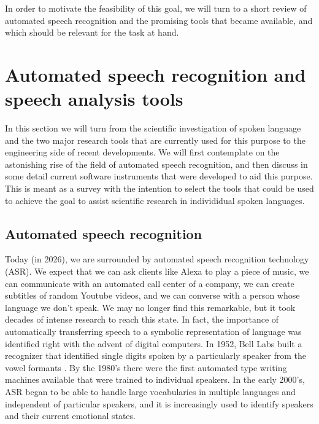 In order to motivate the feasibility of this goal, we will turn to a short review of automated speech recognition and the promising tools that became available, and which should be relevant for the task at hand. 

\chapter{Automated speech recognition and speech analysis tools}
\label{ASR}

In this section we will turn from the scientific investigation of spoken language and the two major research tools that are currently used for this purpose to the engineering side of recent developments. We will first contemplate on the astonishing rise of the field of automated speech recognition, and then discuss in some detail current software instruments that were developed to aid this purpose. This is meant as a survey with the intention to select the tools that could be used to achieve the goal to assist scientific research in individidual spoken languages. 

\section{Automated speech recognition}

Today (in 2026), we are surrounded by automated speech recognition technology (ASR). We expect that we can ask clients like Alexa to play a piece of music, we can communicate with an automated call center of a company, we can create subtitles of random Youtube videos, and we can converse with a person whose language we don't speak. We may no longer find this remarkable, but it took decades of intense research to reach this state. In fact, the importance of automatically transferring speech to a symbolic representation of language was identified right with the advent of digital computers. In 1952, Bell Labs built a recognizer that identified single digits spoken by a particularly speaker from the vowel formants \cite{juang2005}. By the 1980's there were the first automated type writing machines available that were trained to individual speakers. In the early 2000's, ASR began to be able to handle large vocabularies in multiple languages and independent of particular speakers, and it is increasingly used to identify speakers and their current emotional states. 

